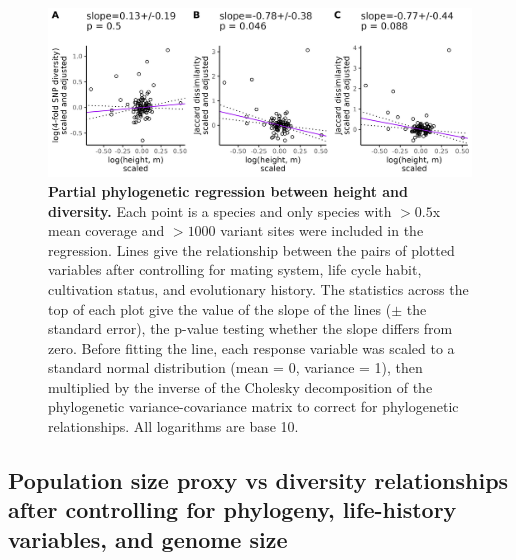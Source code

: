 \documentclass[12pt]{article}
\begin{document}
\begin{figure}[H]
    \centering
    \includegraphics[width=\textwidth]{figures/appendix_d/height_vs_diversity_corrected_2024-12-12.jpg}
    \caption{\textbf{Partial phylogenetic regression between height and diversity.} Each point is a species and only species with $>0.5$x mean coverage and $>1000$ variant sites were included in the regression. Lines give the relationship between the pairs of plotted variables after controlling for mating system, life cycle habit, cultivation status, and evolutionary history. The statistics across the top of each plot give the value of the slope of the lines ($\pm$ the standard error), the p-value testing whether the slope differs from zero. Before fitting the line, each response variable was scaled to a standard normal distribution (mean = 0, variance = 1), then multiplied by the inverse of the Cholesky decomposition of the phylogenetic variance-covariance matrix to correct for phylogenetic relationships. All logarithms are base 10.}
\end{figure}

\subsection*{Population size proxy vs diversity relationships after controlling for phylogeny, life-history variables, and genome size}
\end{document}
